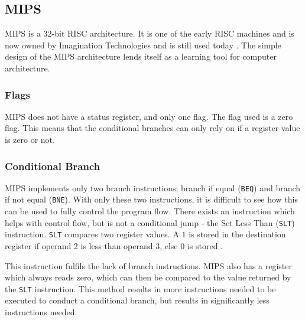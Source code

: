 \documentclass[12pt,a4paper]{article}
\begin{document}
\begin{bibunit}[is-unsrt]
\begin{lstlisting}[frame=single,caption=Intel 8086 assembler for listing \ref{ListC2},label=intel2]
\end{lstlisting}

\subsection{MIPS}

MIPS is a 32-bit RISC architecture.
It is one of the early RISC machines and is now owned by Imagination Technologies and is still used today \cite{mips:wiki}.
The simple design of the MIPS architecture lends itself as a learning tool for computer architecture.

\subsubsection{Flags}

MIPS does not have a status register, and only one flag.
The flag used is a zero flag. 
This means that the conditional branches can only rely on if a register value is zero or not.


\subsubsection{Conditional Branch}

MIPS implements only two branch instructions; branch if equal (\texttt{BEQ}) and branch if not equal (\texttt{BNE}).
With only these two instructions, it is difficult to see how this can be used to fully control the program flow.
There exists an instruction which helps with control flow, but is not a conditional jump - the Set Less Than (\texttt{SLT}) instruction.
\texttt{SLT} compares two register values.
A $1$ is stored in the destination register if operand 2 is less than operand 3, else 0 is stored \cite{patterson2013computer}.

This instruction fulfils the lack of branch instructions.
MIPS also has a register which always reads zero, which can then be compared to the value returned by the \texttt{SLT} instruction.
This method results in more instructions needed to be executed to conduct a conditional branch, but results in significantly less instructions needed.



\end{bibunit}
\end{document}
